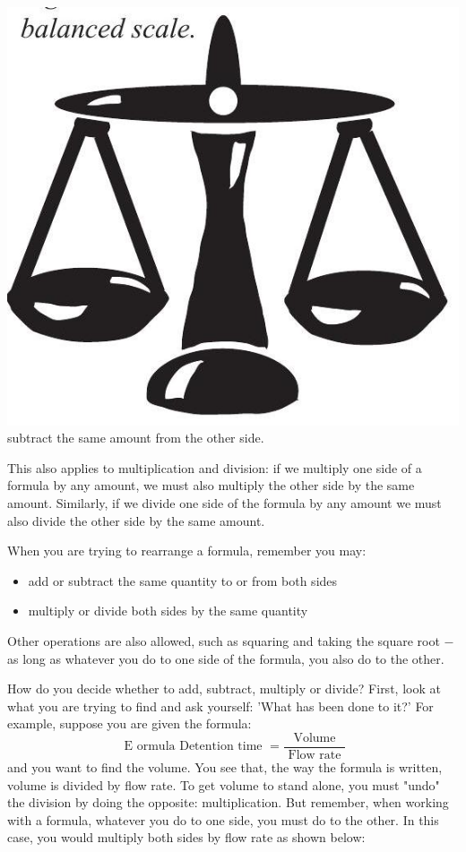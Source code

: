 \documentclass[10pt]{article}
\begin{document}
\includegraphics[max width=\textwidth]{2022_09_16_4d34b76b97ee13a67df7g-08}\\
subtract the same amount from the other side.

This also applies to multiplication and division: if we multiply one side of a formula by any amount, we must also multiply the other side by the same amount. Similarly, if we divide one side of the formula by any amount we must also divide the other side by the same amount.

When you are trying to rearrange a formula, remember you may:

\begin{itemize}
  \item add or subtract the same quantity to or from both sides

  \item multiply or divide both sides by the same quantity

\end{itemize}
Other operations are also allowed, such as squaring and taking the square root $-$ as long as whatever you do to one side of the formula, you also do to the other.

How do you decide whether to add, subtract, multiply or divide? First, look at what you are trying to find and ask yourself: 'What has been done to it?' For example, suppose you are given the formula:
$$
\text { E ormula Detention time }=\frac{\text { Volume }}{\text { Flow rate }}
$$
and you want to find the volume. You see that, the way the formula is written, volume is divided by flow rate. To get volume to stand alone, you must "undo" the division by doing the opposite: multiplication. But remember, when working with a formula, whatever you do to one side, you must do to the other. In this case, you would multiply both sides by flow rate as shown below:
\end{document}
